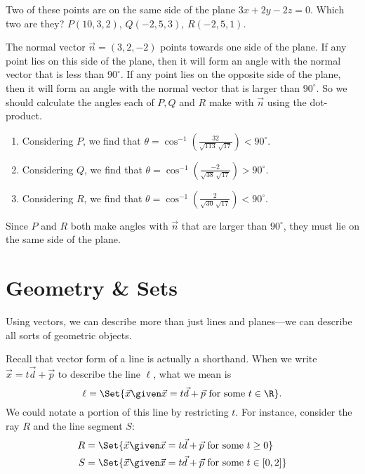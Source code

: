 \begin{exercises}
\begin{problist}
        \prob[\grout]    Two of these points are on the same side of the plane $3x+2y-2z=0$. Which two
        are they? $P(10,3,2)$, $Q(-2,5,3)$, $R(-2,5,1)$.
        \begin{solution}
            The normal vector $\vec{n} = (3,2,-2)$ points towards one side of the plane. If any point
            lies on this side of the plane, then it will form an angle with the normal vector that is
            less than $90^{\circ}$. If any point lies on the opposite side of the plane, then it will
            form an angle with the normal vector that is larger than $90^{\circ}$. So we should
            calculate the angles each of $P,Q$ and $R$ make with $\vec{n}$ using the dot-product.
            \begin{enumerate}
                \item   Considering $P$, we find that $\theta = \cos^{-1} \left(\frac{32}{\sqrt{113}\,
                    \sqrt{17}}\right) < 90^{\circ}$.
                \item   Considering $Q$, we find that $\theta = \cos^{-1}
                    \left(\frac{-2}{\sqrt{38}\,\sqrt{17}}\right) > 90^{\circ}$.
                \item   Considering $R$, we find that $\theta = \cos^{-1}
                    \left(\frac{2}{\sqrt{30}\,\sqrt{17}}\right) < 90^{\circ}$.
            \end{enumerate}
            Since $P$ and $R$ both make angles with $\vec{n}$ that are larger than $90^{\circ}$, they
            must lie on the same side of the plane.
        \end{solution}
    \end{problist}
\end{exercises}



\section{Geometry \& Sets}

Using vectors, we can describe more than just lines and planes---we can describe 
all sorts of geometric objects.

Recall that vector form of a line is actually a shorthand. When we write $\vec x=t\vec d+\vec p$
to describe the line $\ell$,
what we mean is
\[
	\ell=\Set{\vec x\given \vec x=t\vec d+\vec p\text{ for some }t\in \R}.
\]
We could notate a portion of this line by restricting $t$. For instance, consider the ray $R$
and the line segment $S$:
\begin{align*}
	R&=\Set{\vec x\given \vec x=t\vec d+\vec p\text{ for some }t\geq 0}\\
	S&=\Set{\vec x\given \vec x=t\vec d+\vec p\text{ for some }t\in [0,2]}
\end{align*}


